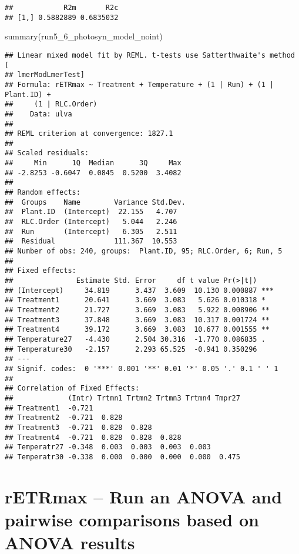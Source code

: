 \documentclass[
]{article}
\newenvironment{Shaded}{\begin{snugshade}}{\end{snugshade}}
\newcommand{\FunctionTok}[1]{\textcolor[rgb]{0.00,0.00,0.00}{#1}}
\newcommand{\NormalTok}[1]{#1}
\begin{document}
\begin{verbatim}
##            R2m       R2c
## [1,] 0.5882889 0.6835032
\end{verbatim}

\begin{Shaded}
\begin{Highlighting}[]
\FunctionTok{summary}\NormalTok{(run5\_6\_photosyn\_model\_noint)}
\end{Highlighting}
\end{Shaded}

\begin{verbatim}
## Linear mixed model fit by REML. t-tests use Satterthwaite's method [
## lmerModLmerTest]
## Formula: rETRmax ~ Treatment + Temperature + (1 | Run) + (1 | Plant.ID) +  
##     (1 | RLC.Order)
##    Data: ulva
## 
## REML criterion at convergence: 1827.1
## 
## Scaled residuals: 
##     Min      1Q  Median      3Q     Max 
## -2.8253 -0.6047  0.0845  0.5200  3.4082 
## 
## Random effects:
##  Groups    Name        Variance Std.Dev.
##  Plant.ID  (Intercept)  22.155   4.707  
##  RLC.Order (Intercept)   5.044   2.246  
##  Run       (Intercept)   6.305   2.511  
##  Residual              111.367  10.553  
## Number of obs: 240, groups:  Plant.ID, 95; RLC.Order, 6; Run, 5
## 
## Fixed effects:
##               Estimate Std. Error     df t value Pr(>|t|)    
## (Intercept)     34.819      3.437  3.609  10.130 0.000887 ***
## Treatment1      20.641      3.669  3.083   5.626 0.010318 *  
## Treatment2      21.727      3.669  3.083   5.922 0.008906 ** 
## Treatment3      37.848      3.669  3.083  10.317 0.001724 ** 
## Treatment4      39.172      3.669  3.083  10.677 0.001555 ** 
## Temperature27   -4.430      2.504 30.316  -1.770 0.086835 .  
## Temperature30   -2.157      2.293 65.525  -0.941 0.350296    
## ---
## Signif. codes:  0 '***' 0.001 '**' 0.01 '*' 0.05 '.' 0.1 ' ' 1
## 
## Correlation of Fixed Effects:
##             (Intr) Trtmn1 Trtmn2 Trtmn3 Trtmn4 Tmpr27
## Treatment1  -0.721                                   
## Treatment2  -0.721  0.828                            
## Treatment3  -0.721  0.828  0.828                     
## Treatment4  -0.721  0.828  0.828  0.828              
## Temperatr27 -0.348  0.003  0.003  0.003  0.003       
## Temperatr30 -0.338  0.000  0.000  0.000  0.000  0.475
\end{verbatim}

\hypertarget{retrmax-run-an-anova-and-pairwise-comparisons-based-on-anova-results}{%
\section{rETRmax -- Run an ANOVA and pairwise comparisons based on ANOVA
results}\label{retrmax-run-an-anova-and-pairwise-comparisons-based-on-anova-results}}
\end{document}
